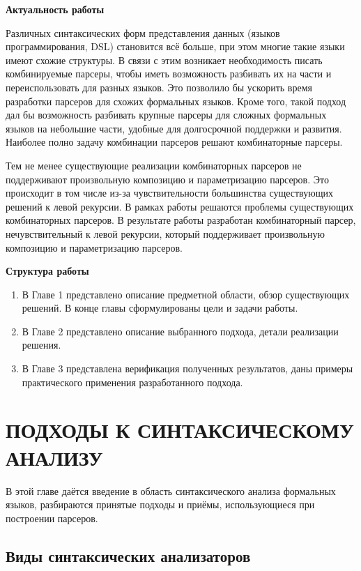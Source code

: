 \documentclass[times]{itmo-student-thesis}
\begin{document}
\tableofcontents

\startprefacepage
\textbf{Актуальность работы}

Различных синтаксических форм представления данных (языков программирования, DSL) становится всё больше, при этом
многие	такие языки имеют схожие структуры. В связи с этим возникает необходимость писать комбинируемые парсеры, чтобы
иметь возможность разбивать их на части и переиспользовать для разных языков. Это позволило бы ускорить время
разработки парсеров для схожих формальных языков. Кроме того, такой подход дал бы возможность разбивать крупные парсеры
для сложных формальных языков на небольшие части, удобные для долгосрочной поддержки и развития. Наиболее полно задачу
комбинации парсеров решают комбинаторные парсеры. 

Тем не менее существующие реализации комбинаторных парсеров не поддерживают произвольную композицию и параметризацию
парсеров. Это происходит в том числе из-за чувствительности большинства существующих решений к левой рекурсии. В рамках
работы решаются проблемы существующих комбинаторных парсеров. В результате работы разработан комбинаторный парсер,
нечувствительный к левой рекурсии, который поддерживает произвольную композицию и параметризацию парсеров.

\textbf{Структура работы}

\begin{enumerate}
    \item В Главе 1 представлено описание предметной области, обзор существующих решений. В конце главы сформулированы 
    цели и задачи работы.
    \item В Главе 2 представлено описание выбранного подхода, детали реализации решения.
    \item В Главе 3 представлена верификация полученных результатов, даны примеры практического применения 
    разработанного подхода.
\end{enumerate}

\chapter{ПОДХОДЫ К СИНТАКСИЧЕСКОМУ АНАЛИЗУ}

В этой главе даётся введение в область синтаксического анализа формальных языков, разбираются принятые подходы и приёмы, 
использующиеся при построении парсеров.

\section{Виды синтаксических анализаторов}\label{sec:parsing_approaches}
\end{document}
